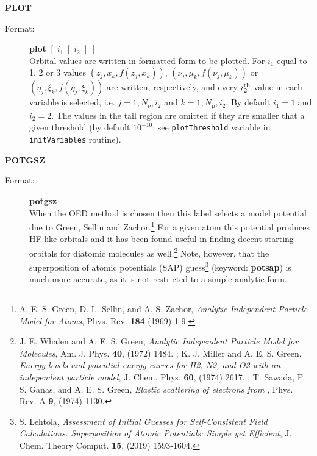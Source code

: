 \documentclass[10pt,a4paper]{article}
\begin{document}
\begin{description}
\item \textbf{PLOT}
\begin{description}
\item[Format:] \textbf{plot} $[\;i_1\;[\;i_2\;]\;]$\\
  Orbital values are written in formatted form to be plotted.  For $i_1$
  equal to 1, 2 or 3 values $(z_j,x_k,f(z_j,x_k))$,
  $(\nu_j,\mu_k,f(\nu_j,\mu_k))$ or $(\eta_j,\xi_k,f(\eta_j,\xi_k))$ are
  written, respectively, and every $i_2^{\rm th}$ value in each variable is
  selected, i.e. $j=1,N_{\nu},i_2$ and $k=1,N_{\mu},i_2$. By default $i_1=1$
  and $i_2=2$. The values in the tail region are omitted if they are
  smaller that a given threshold (by default $10^{-10}$; see
  \texttt{plotThreshold} variable in \texttt{initVariables} routine).

\end{description}


\item \textbf{POTGSZ}
\begin{description}
\item[Format:] \textbf{potgsz} \\ When the OED method is chosen then
  this label selects a model potential due to Green, Sellin and
  Zachor.\footnote{A. E. S. Green, D. L. Sellin, and A. S. Zachor,
    \textsl{Analytic Independent-Particle Model for Atoms},
    Phys. Rev. \textbf{184} (1969) 1-9. }
  For a given atom this potential produces HF-like orbitals and it has
  been found useful in finding decent starting orbitals for diatomic
  molecules as well.\footnote{J. E. Whalen and A. E. S. Green,
    \textsl{Analytic Independent Particle Model for Molecules},
    Am. J. Phys. \textbf{40}, (1972) 1484. ;
    K. J. Miller and A. E. S. Green, \textsl{Energy levels and
      potential energy curves for H2, N2, and O2 with an independent
      particle model}, J. Chem. Phys. \textbf{60}, (1974)
    2617. ; T. Sawada, P. S. Ganas, and
    A. E. S. Green, \textsl{Elastic scattering of electrons from
      }, Phys. Rev. A \textbf{9}, (1974)
    1130. } Note, however, that the
  superposition of atomic potentials (SAP) guess\footnote{S. Lehtola,
    \textsl{Assessment of Initial Guesses for Self-Consistent Field
      Calculations. Superposition of Atomic Potentials: Simple yet
      Efficient}, J. Chem. Theory Comput. \textbf{15}, (2019)
    1593-1604. } (keyword:
  \textbf{potsap}) is much more accurate, as it is not restricted to a
  simple analytic form.
\end{description}


\end{description}
\end{document}

